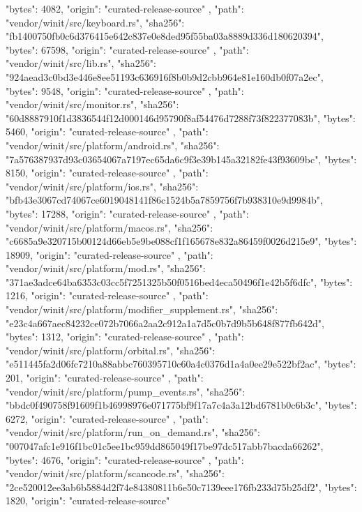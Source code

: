 {{      "bytes": 4082,
      "origin": "curated-release-source"
    },
    {
      "path": "vendor/winit/src/keyboard.rs",
      "sha256": "fb1400750fb0c6d376415e642c837e0e8ded95f55ba03a8889d336d180620394",
      "bytes": 67598,
      "origin": "curated-release-source"
    },
    {
      "path": "vendor/winit/src/lib.rs",
      "sha256": "924aead3c0bd3e446e8ee51193c636916f8b0b9d2cbb964e81e160db0f07a2ec",
      "bytes": 9548,
      "origin": "curated-release-source"
    },
    {
      "path": "vendor/winit/src/monitor.rs",
      "sha256": "60d8887910f1d3836544f12d000146d95790f8af54476d7288f73f822377083b",
      "bytes": 5460,
      "origin": "curated-release-source"
    },
    {
      "path": "vendor/winit/src/platform/android.rs",
      "sha256": "7a576387937d93c03654067a7197ec65da6c9f3e39b145a32182fe43f93609bc",
      "bytes": 8150,
      "origin": "curated-release-source"
    },
    {
      "path": "vendor/winit/src/platform/ios.rs",
      "sha256": "bfb43e3067cd74067ce6019048141f86c1524b5a7859756f7b938310e9d9984b",
      "bytes": 17288,
      "origin": "curated-release-source"
    },
    {
      "path": "vendor/winit/src/platform/macos.rs",
      "sha256": "c6685a9e320715b00124d66eb5e9be088cf1f165678e832a86459f0026d215e9",
      "bytes": 18909,
      "origin": "curated-release-source"
    },
    {
      "path": "vendor/winit/src/platform/mod.rs",
      "sha256": "371ae3adce64ba6353c03cc5f7251325b50f0516bed4eca50496f1e42b5f6dfc",
      "bytes": 1216,
      "origin": "curated-release-source"
    },
    {
      "path": "vendor/winit/src/platform/modifier_supplement.rs",
      "sha256": "e23c4a667aec84232ce072b7066a2aa2c912a1a7d5c0b7d9b5b648f877fb642d",
      "bytes": 1312,
      "origin": "curated-release-source"
    },
    {
      "path": "vendor/winit/src/platform/orbital.rs",
      "sha256": "e511445fa2d06fc7210a88abbc760395710c60a4c0376d1a4a0ee29e522bf2ac",
      "bytes": 201,
      "origin": "curated-release-source"
    },
    {
      "path": "vendor/winit/src/platform/pump_events.rs",
      "sha256": "bbdc0f490758f91609f1b46998976e071775bf9f17a7c4a3a12bd6781b0c6b3c",
      "bytes": 6272,
      "origin": "curated-release-source"
    },
    {
      "path": "vendor/winit/src/platform/run_on_demand.rs",
      "sha256": "007047afc1e916f1bc01c5ee1bc959dd865049f17be97dc517abb7bacda66262",
      "bytes": 4676,
      "origin": "curated-release-source"
    },
    {
      "path": "vendor/winit/src/platform/scancode.rs",
      "sha256": "2ce520012ee3ab6b5884d2f74e84380811b6e50c7139eee176fb233d75b25df2",
      "bytes": 1820,
      "origin": "curated-release-source"
}}
